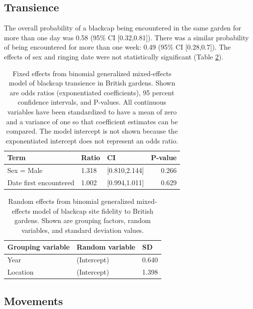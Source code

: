 \documentclass[a4paper, twoside]{templates/ociamthesis}
\begin{document}
\hypertarget{transience-1}{%
\subsection{Transience}\label{transience-1}}

The overall probability of a blackcap being encountered in the same garden for more than one day was 0.58 (95\% CI {[}0.32,0.81{]}). There was a similar probability of being encountered for more than one week: 0.49 (95\% CI {[}0.28,0.7{]}). The effects of sex and ringing date were not statistically significant (Table \ref{tab:transience-model-table}).

\begin{table}[t]

\caption{\label{tab:transience-model-table}Fixed effects from binomial generalized mixed-effects model of blackcap transience in British gardens. Shown are odds ratios (exponentiated coefficients), 95 percent confidence intervals, and P-values. All continuous variables have been standardized to have a mean of zero and a variance of one so that coefficient estimates can be compared. The model intercept is not shown because the exponentiated intercept does not represent an odds ratio.}
\centering
\begin{tabular}{l|l|l|r}
\hline
Term & Ratio & CI & P-value\\
\hline
Sex = Male & 1.318 & [0.810,2.144] & 0.266\\
\hline
Date first encountered & 1.002 & [0.994,1.011] & 0.629\\
\hline
\end{tabular}
\end{table}

\begin{table}[t]

\caption{\label{tab:transience-model-table}Random effects from binomial generalized mixed-effects model of blackcap site fidelity to British gardens. Shown are grouping factors, random variables, and standard deviation values.}
\centering
\begin{tabular}{l|l|l}
\hline
Grouping variable & Random variable & SD\\
\hline
Year & (Intercept) & 0.640\\
\hline
Location & (Intercept) & 1.398\\
\hline
\end{tabular}
\end{table}

\hypertarget{movements-1}{%
\subsection{Movements}\label{movements-1}}
\end{document}
